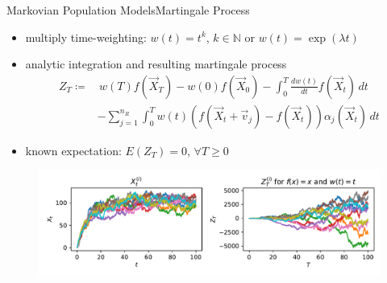 \documentclass[10pt]{beamer}
\newcommand{\expSym}{{E}}
\newcommand{\E}[1]{\ensuremath{\expSym\left(#1\right)}}
\begin{document}
\begin{frame}{Markovian Population Models}{Martingale Process}
    \begin{itemize}
    \item multiply time-weighting: $w(t)=t^k$, $k\in\mathbb{N}$ or $w(t)=\exp(\lambda t)$
    \item analytic integration and resulting martingale process
        \begin{equation*}
            \begin{split}
            Z_T\coloneqq&\,w(T)f(\vec X_T) - w(0)f(\vec X_{0}) -
            \int_{0}^T\frac{dw(t)}{dt}f(\vec X_t)\,dt\\
            &-\sum_{j=1}^{n_R}\int_{0}^Tw(t)
                 (f(\vec X_t+\vec v_j) - f(\vec X_t))\alpha_j(\vec X_t)\,dt
         \end{split}
        \end{equation*}
    \item known expectation: $\E{Z_T}=0$, $\forall T\geq 0$
  \end{itemize}
    \begin{figure}
        \includegraphics[scale=.5]{../gfx/martingales.pdf}
    \end{figure}
\end{frame}
\end{document}
